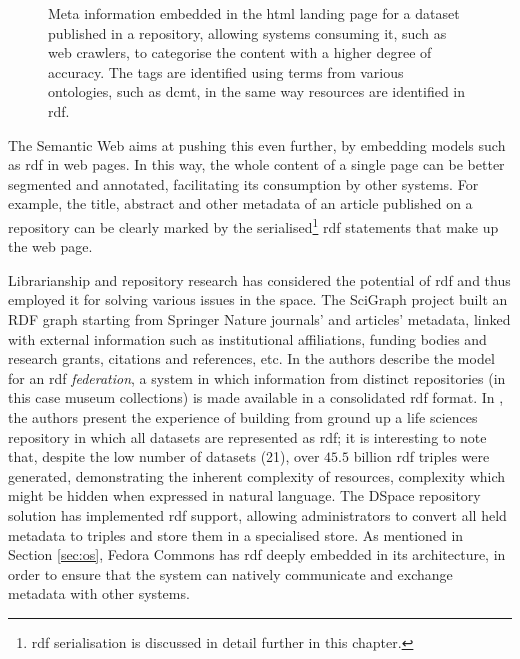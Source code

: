 \begin{figure}[thpb]
  \centering
  \caption{Meta information embedded in the \gls{html} landing page for a dataset published in a repository, allowing systems consuming it, such as web crawlers, to categorise the content with a higher degree of accuracy. The tags are identified using terms from various ontologies, such as \gls{dcmt}, in the same way resources are identified in \gls{rdf}.}
  \label{fig:meta}
\end{figure}

The Semantic Web aims at pushing this even further, by embedding models such as \gls{rdf} in web pages. In this way, the whole content of a single page can be better segmented and annotated, facilitating its consumption by other systems. For example, the title, abstract and other metadata of an article published on a repository can be clearly marked by the serialised\footnote{\gls{rdf} serialisation is discussed in detail further in this chapter.} \gls{rdf} statements that make up the web page. 

Librarianship and repository research has considered the potential of \gls{rdf} and thus employed it for solving various issues in the space. The SciGraph project \cite{scigraph} built an RDF graph starting from Springer Nature journals' and articles' metadata, linked with external information such as institutional affiliations, funding bodies and research grants, citations and references, etc.  In \cite{ichim} the authors describe the model for an \gls{rdf} \emph{federation}, a system in which information from distinct repositories (in this case museum collections) is made available in a consolidated \gls{rdf} format. In \cite{nbdc}, the authors present the experience of building from ground up a life sciences repository in which all datasets are represented as \gls{rdf}; it is interesting to note that, despite the low number of datasets (21), over $45.5$ billion \gls{rdf} triples were generated, demonstrating the inherent complexity of resources, complexity which might be hidden when expressed in natural language. The DSpace repository solution has implemented \gls{rdf} support\cite{dspacerdf}, allowing administrators to convert all held metadata to triples and store them in a specialised store. As mentioned in Section \ref{sec:os}, Fedora Commons has \gls{rdf} deeply embedded in its architecture, in order to ensure that the system can natively communicate and exchange metadata with other systems.


